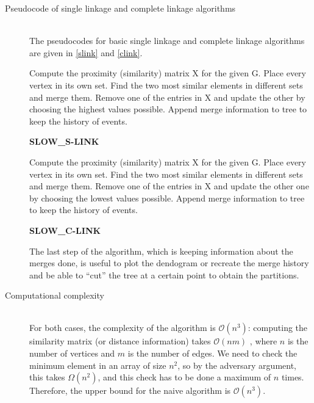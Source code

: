\documentclass[12pt,a4paper]{article}
\begin{document}
\begin{description}
\item[Pseudocode of single linkage and complete linkage algorithms] \hfill
  \\
  The pseudocodes for basic single linkage and complete linkage
  algorithms are given in \ref{slink} and \ref{clink}.

  \begin{algorithm}[h]
    \SetAlgoLined

    \nl Compute the proximity (similarity) matrix X for the given G.\;
    \nl Place every vertex in its own set.\;
    \nl Find the two most similar elements in different sets and merge them.\;
    \nl Remove one of the entries in X and update the other by choosing the highest
    values possible.\;
    \nl Append merge information to tree to keep the history of events.\;
    \nl {}
    \caption{\bf SLOW\_S-LINK}
    \label{slink}
  \end{algorithm}

  \begin{algorithm}[h]
    \SetAlgoLined

    \nl Compute the proximity (similarity) matrix X for the given G.\;
    \nl Place every vertex in its own set.\;
    \nl Find the two most similar elements in different sets and merge them.\;
    \nl Remove one of the entries in X and update the other one by choosing the lowest
    values possible.\;
    \nl Append merge information to tree to keep the history of events.\;
    \nl {}
    \caption{\bf SLOW\_C-LINK}
    \label{clink}
  \end{algorithm}

  The last step of the algorithm, which is keeping information about
  the merges done, is useful to plot the dendogram or recreate the
  merge history and be able to ``cut'' the tree at a certain point to
  obtain the partitions.

\item[Computational complexity] \hfill \\

  For both cases, the complexity of the algorithm is
  $\mathcal{O}(n^3)$: computing the similarity matrix (or distance
  information) takes $\mathcal{O}(nm)$ \cite{newman}, where $n$ is the
  number of vertices and $m$ is the number of edges. We need to check
  the minimum element in an array of size $n^2$, so by the adversary
  argument, this takes $\Omega (n^2)$, and this check has to be
  done a maximum of $n$ times. Therefore, the upper bound for the
  naive algorithm is $\mathcal{O}(n^3)$.


\end{description}
\end{document}

